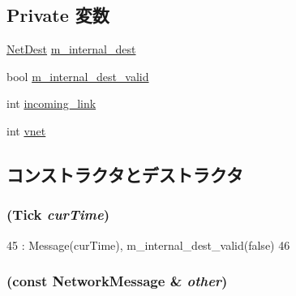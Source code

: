 \subsection*{Private 変数}
\begin{DoxyCompactItemize}
\item 
\hyperlink{classNetDest}{NetDest} \hyperlink{classNetworkMessage_a737600b7a1d25511b0609d6431ab26d1}{m\_\-internal\_\-dest}
\item 
bool \hyperlink{classNetworkMessage_a6b68467ba70ed46ae387b63f06d00fe7}{m\_\-internal\_\-dest\_\-valid}
\item 
int \hyperlink{classNetworkMessage_ae7c7bd0fd6c56359474754aae4107cfd}{incoming\_\-link}
\item 
int \hyperlink{classNetworkMessage_acc8dd50b5d5c79da5385db12c7cdd74b}{vnet}
\end{DoxyCompactItemize}


\subsection{コンストラクタとデストラクタ}
\hypertarget{classNetworkMessage_a27c72ea92bff9430ebe2082e620834ab}{
\subsubsection[{NetworkMessage}]{ ({\bf Tick} {\em curTime})}}
\label{classNetworkMessage_a27c72ea92bff9430ebe2082e620834ab}



\begin{DoxyCode}
45         : Message(curTime), m_internal_dest_valid(false)
46     { }
\end{DoxyCode}
\hypertarget{classNetworkMessage_a9cf94db27107f3a20374275c9c9264c9}{
\subsubsection[{NetworkMessage}]{ (const {\bf NetworkMessage} \& {\em other})}}
\label{classNetworkMessage_a9cf94db27107f3a20374275c9c9264c9}



